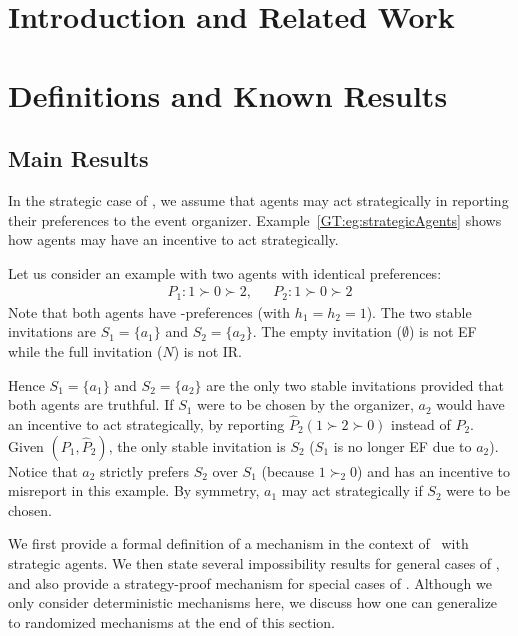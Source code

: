 \section{Introduction and Related Work}  \label{GT:sec:intro}


\section{Definitions and Known Results} \label{GT:sec:prelim}


\subsection{Main Results}\label{GT:sec:Mechanism}
In the strategic case of \ASIP, we assume that agents may act strategically in reporting their preferences to the event organizer. 
Example~\ref{GT:eg:strategicAgents} shows how agents may have an incentive to act strategically. 


\begin{example} \label{GT:eg:strategicAgents}
	
	Let us consider an example with two agents with identical preferences:
	\begin{equation*}
		\begin{aligned}
				P_1: 1 \succ 0 \succ 2,~~~& P_2: 1 \succ 0 \succ 2
		\end{aligned}
	\end{equation*}
	Note that both agents have \DEC-preferences (with $h_1 = h_2 = 1$).
	The two stable invitations are $S_1 = \{a_1\}$ and $S_2 = \{a_2\}$. 
	The empty invitation ($\emptyset$) is not EF while the full invitation ($N$) is not IR. 

	Hence $S_1 = \{a_1\}$ and $S_2 =\{a_2\}$ are the only two stable invitations provided that both agents are truthful. 
	If $S_1$ were to be chosen by the organizer, $a_2$ would have an incentive to act strategically, by reporting $\hat{P}_2 (1 \succ 2 \succ 0)$ instead of $P_2$. 
	Given $(P_1, \hat{P}_2)$, the only stable invitation is $S_2$ ($S_1$ is no longer EF due to $a_2$).
	Notice that $a_2$ strictly prefers $S_2$ over $S_1$ (because $1 \succ_2 0$) and has an incentive to misreport in this example. By symmetry, $a_1$ may act strategically if $S_2$ were to be chosen. 
\end{example}

We first provide a formal definition of a mechanism in the context of \ASIP\ with strategic agents. 
We then state several impossibility results for general cases of \ASIP, and also provide a strategy-proof mechanism for special cases of \ASIP.  Although we only consider deterministic mechanisms here, we discuss how one can generalize to randomized mechanisms at the end of this section.

